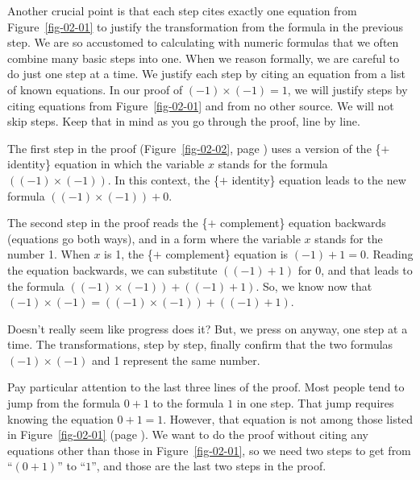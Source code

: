 Another crucial point is that each step cites
exactly one equation from Figure~\ref{fig-02-01}
to justify the transformation from the formula in the previous step.
We are so accustomed to calculating with numeric formulas that
we often combine many basic steps into one. When we reason formally,
we are careful to do just one step at a time.
We justify each step by citing an equation
from a list of known equations. In our proof of $(-1)\times(-1) = 1$,
we will justify steps by citing equations from Figure~\ref{fig-02-01}
and from no other source. We will not skip steps.
Keep that in mind as you go through the proof, line by line.

The first step in the proof
(Figure~\ref{fig-02-02}, page \pageref{fig-02-02}) uses a version of the
\{$+$ identity\} equation in which the variable $x$ stands for the
formula $((-1)\times(-1))$.
In this context, the \{$+$ identity\} equation
leads to the new formula $((-1)\times(-1)) + 0$.

The second step in the proof reads the \{$+$ complement\}
equation backwards (equations go both ways), and in a form
where the variable $x$ stands for the number 1.
When $x$ is 1, the \{$+$ complement\} equation is
$(-1) + 1 = 0$.
Reading the equation backwards, we can substitute
$((-1) + 1)$ for $0$,
and that leads to the formula $((-1)\times(-1)) + ((-1) + 1)$.
So, we know now that
$(-1)\times(-1) = ((-1)\times(-1)) + ((-1) + 1)$.

Doesn't really seem like progress does it?
But, we press on anyway, one step at a time.
The transformations, step by step, finally confirm that the two formulas
$(-1)\times(-1)$ and 1 represent the same number.

Pay particular attention to the last three lines of the proof.
Most people tend to jump from the formula $0+1$ to the
formula $1$ in one step. That jump requires knowing the equation
$0+1 = 1$. However, that equation is not among those listed in
Figure~\ref{fig-02-01} (page \pageref{fig-02-01}).
We want to do the proof without citing any equations
other than those in Figure~\ref{fig-02-01}, so we need two steps
to get from ``$(0+1)$'' to ``$1$'',
and those are the last two steps in the proof.

